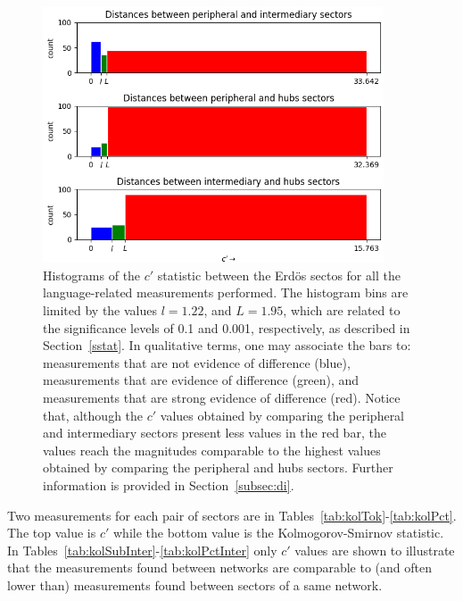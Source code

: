 \documentclass[review]{elsarticle}
\begin{document}
\begin{figure}[!h]
\centering
\includegraphics[width=0.9\textwidth]{figs/hists}
  \caption{Histograms of the $c'$ statistic between the Erd\"os sectos for all the language-related measurements performed. The histogram bins are limited by the values $l=1.22$, and $L=1.95$, which are related to the significance levels of 0.1 and 0.001, respectively, as described in Section~\ref{sstat}. 
  In qualitative terms, one may associate the bars to:
  measurements that are not evidence of difference (blue),
  measurements that are evidence of difference (green),
  and measurements that are strong evidence of difference (red).
  Notice that, although the $c'$ values obtained by comparing the peripheral and intermediary sectors present less values in the red bar, the values reach the magnitudes comparable to the highest values obtained by comparing the peripheral and hubs sectors.
  Further information is provided in Section~\ref{subsec:di}.}
\label{fdif}
\end{figure}

Two measurements for each pair of sectors are in Tables~\ref{tab:kolTok}-\ref{tab:kolPct}.
 The top value is $c'$ while the bottom value is the Kolmogorov-Smirnov statistic.
 In Tables~\ref{tab:kolSubInter}-\ref{tab:kolPctInter} only $c'$ values are shown to illustrate
 that the measurements found between networks are comparable to (and often lower than) measurements found between sectors of a same network.
 
 
 

 
 
 
 
\end{document}
